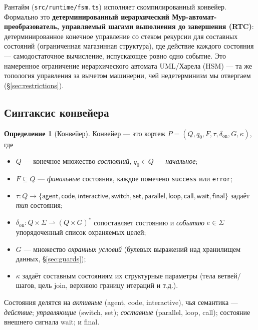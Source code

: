\documentclass[11pt]{article}
\theoremstyle{plain}
\theoremstyle{definition}
\newtheorem{definition}[theorem]{Определение}
\theoremstyle{remark}
\newcommand{\code}[1]{\texttt{#1}}
\newcommand{\state}[1]{\textsf{#1}}
\begin{document}
Рантайм (\code{src/runtime/fsm.ts}) исполняет скомпилированный конвейер. Формально это
\textbf{детерминированный иерархический Мур-автомат-преобразователь, управляемый шагами
выполнения до завершения (RTC)}: детерминированное конечное управление со стеком
рекурсии для составных состояний (ограниченная магазинная структура), где действие
каждого состояния --- самодостаточное вычисление, испускающее ровно одно событие. Это
намеренное ограничение иерархического автомата UML/Харела (HSM) --- та же топология
управления за вычетом машинерии, чей недетерминизм мы отвергаем
(\S\ref{sec:restrictions}).

\subsection{Синтаксис конвейера}

\begin{definition}[Конвейер]\label{def:pipeline}
Конвейер --- это кортеж $P = (Q, q_0, F, \tau, \delta_{\mathrm{on}}, G, \kappa)$, где
\begin{itemize}[nosep]
  \item $Q$ --- конечное множество \emph{состояний}, $q_0 \in Q$ --- \emph{начальное};
  \item $F \subseteq Q$ --- \emph{финальные} состояния, каждое помечено \code{success} или \code{error};
  \item $\tau : Q \to \{\state{agent}, \state{code}, \state{interactive}, \state{switch},
        \state{set}, \state{parallel}, \state{loop}, \state{call}, \state{wait}, \state{final}\}$
        задаёт \emph{тип} состояния;
  \item $\delta_{\mathrm{on}} : Q \times \Sigma \rightharpoonup (Q \times G)^{*}$
        сопоставляет состоянию и \emph{событию} $e \in \Sigma$ упорядоченный список
        охраняемых целей;
  \item $G$ --- множество \emph{охранных условий} (булевых выражений над хранилищем данных, \S\ref{sec:guards});
  \item $\kappa$ задаёт составным состояниям их структурные параметры (тела ветвей/шагов,
        цель join, верхнюю границу итераций и т.д.).
\end{itemize}
\end{definition}

Состояния делятся на \emph{активные} (\state{agent}, \state{code}, \state{interactive}),
чья семантика --- \emph{действие}; \emph{управляющие} (\state{switch}, \state{set});
\emph{составные} (\state{parallel}, \state{loop}, \state{call}); состояние внешнего
сигнала \state{wait}; и \state{final}.
\end{document}
